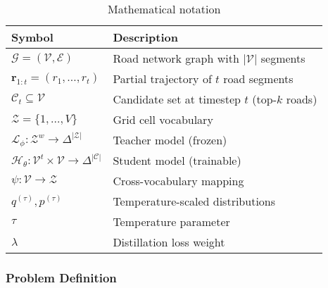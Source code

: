 \begin{table}[h]
    \centering
    \caption{Mathematical notation}
    \label{tab:notation}
    \begin{tabular}{ll}
        \toprule
        \textbf{Symbol}                                                                    & \textbf{Description}                             \\
        \midrule
        $\mathcal{G} = (\mathcal{V}, \mathcal{E})$                                         & Road network graph with $|\mathcal{V}|$ segments \\
        $\mathbf{r}_{1:t} = (r_1, \ldots, r_t)$                                            & Partial trajectory of $t$ road segments          \\
        $\mathcal{C}_t \subseteq \mathcal{V}$                                              & Candidate set at timestep $t$ (top-$k$ roads)    \\
        $\mathcal{Z} = \{1, \ldots, V\}$                                                   & Grid cell vocabulary             \\
        \midrule
        $\mathcal{L}_\phi : \mathcal{Z}^w \to \Delta^{|\mathcal{Z}|}$                      & Teacher model (frozen)                           \\
        $\mathcal{H}_\theta : \mathcal{V}^t \times \mathcal{V} \to \Delta^{|\mathcal{C}|}$ & Student model (trainable)                        \\
        $\psi : \mathcal{V} \to \mathcal{Z}$                                               & Cross-vocabulary mapping                         \\
        $q^{(\tau)}, p^{(\tau)}$                                                           & Temperature-scaled distributions                 \\
        $\tau$                                                                             & Temperature parameter                            \\
        $\lambda$                                                                          & Distillation loss weight                         \\
        \bottomrule
    \end{tabular}
\end{table}

\subsubsection{Problem Definition}
\label{sec:method-problem}

